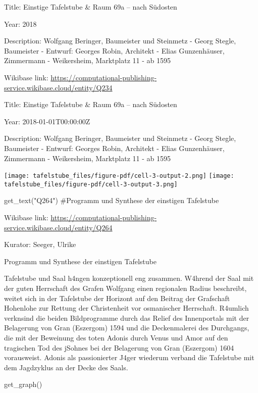 \documentclass[
  a4paper,
  portrait]{book}
\newenvironment{Shaded}{\begin{snugshade}}{\end{snugshade}}
\newcommand{\CommentTok}[1]{\textcolor[rgb]{0.37,0.37,0.37}{#1}}
\newcommand{\NormalTok}[1]{\textcolor[rgb]{0.00,0.23,0.31}{#1}}
\newcommand{\StringTok}[1]{\textcolor[rgb]{0.13,0.47,0.30}{#1}}
\begin{document}
Title: Einstige Tafelstube \& Raum 69a -- nach Südosten

Year: 2018

Description: Wolfgang Beringer, Baumeister und Steinmetz - Georg Stegle,
Baumeister - Entwurf: Georges Robin, Architekt - Elias Gunzenhäuser,
Zimmermann - Weikersheim, Marktplatz 11 - ab 1595

Wikibase link:
\url{https://computational-publishing-service.wikibase.cloud/entity/Q234}

Title: Einstige Tafelstube \& Raum 69a -- nach Südosten

Year: 2018-01-01T00:00:00Z

Description: Wolfgang Beringer, Baumeister und Steinmetz - Georg Stegle,
Baumeister - Entwurf: Georges Robin, Architekt - Elias Gunzenhäuser,
Zimmermann - Weikersheim, Marktplatz 11 - ab 1595

\texttt{[image: tafelstube\_files/figure-pdf/cell-3-output-2.png]}
\texttt{[image: tafelstube\_files/figure-pdf/cell-3-output-3.png]}

\begin{Shaded}
\begin{Highlighting}[]
\NormalTok{get\_text(}\StringTok{"Q264"}\NormalTok{)}
\CommentTok{\#Programm und Synthese der einstigen Tafelstube}
\end{Highlighting}
\end{Shaded}

Wikibase link:
\url{https://computational-publishing-service.wikibase.cloud/entity/Q264}

Kurator: Seeger, Ulrike

Programm und Synthese der einstigen Tafelstube

Tafelstube und Saal h\xa4ngen konzeptionell eng zusammen.
W\xa4hrend der Saal mit der guten Herrschaft des Grafen Wolfgang
einen regionalen Radius beschreibt, weitet sich in der Tafelstube der
Horizont auf den Beitrag der Grafschaft Hohenlohe zur Rettung der
Christenheit vor osmanischer Herrschaft. R\xa4umlich
verkn\xbcpft sind die beiden Bildprogramme durch das Relief des
Innenportals mit der Belagerung von Gran (Eszergom) 1594 und die
Deckenmalerei des Durchgangs, die mit der Beweinung des toten Adonis
durch Venus und Amor auf den tragischen Tod des j\xbcngsten Sohnes
bei der Belagerung von Gran (Eszergom) 1604 vorausweist. Adonis als
passionierter J\xa4ger wiederum verband die Tafelstube mit dem
Jagdzyklus an der Decke des Saals.

\begin{Shaded}
\begin{Highlighting}[]
\NormalTok{get\_graph()}
\end{Highlighting}
\end{Shaded}
\end{document}
